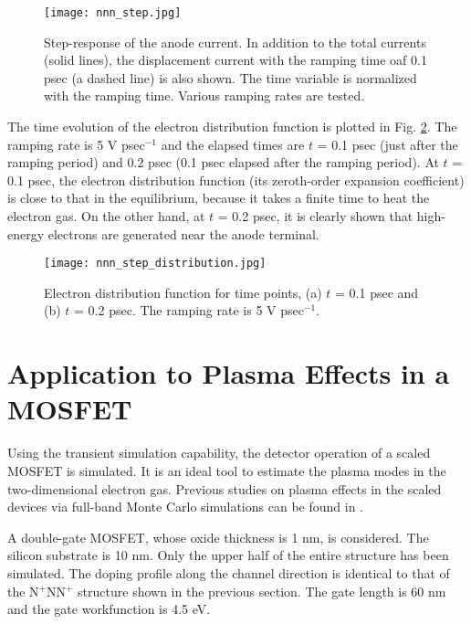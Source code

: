 \documentclass[journal]{IEEEtran}
\newcommand{\revision}[1]{{#1}}
\begin{document}
\begin{figure}[!t]
\centering
\texttt{[image: nnn\_step.jpg]}
\caption{Step-response of the anode current. 
\revision{In addition to the total currents (solid lines), the displacement current with the ramping time oaf 0.1 psec (a dashed line) is also shown.}
The time variable is normalized with the ramping time.
Various ramping rates are tested.}
\label{fig_nnn_step}
\end{figure}  

   The time evolution of the electron distribution function is plotted in Fig. \ref{fig_nnn_step_distribution}.    
   The ramping rate is 5 V psec$^{-1}$ and the elapsed times are $t$ = 0.1 psec (just after the ramping period) and 0.2 psec (0.1 psec elapsed after the ramping period).
   At $t$ = 0.1 psec, the electron distribution function (its zeroth-order expansion coefficient) is close to that in the equilibrium, because it takes a finite time to heat the electron gas.
   On the other hand, at $t$ = 0.2 psec, it is clearly shown that high-energy electrons are generated near the anode terminal. 

\begin{figure}[!t]
\centering
\texttt{[image: nnn\_step\_distribution.jpg]}
\caption{Electron distribution function for time points, (a) $t$ = 0.1 psec and (b) $t$ = 0.2 psec.
The ramping rate is 5 V psec$^{-1}$.
}
\label{fig_nnn_step_distribution}
\end{figure} 
   

\section{Application to Plasma Effects in a MOSFET}

\revision{Using the transient simulation capability,
the detector operation of a scaled MOSFET is simulated.}
   It is an ideal tool to estimate the plasma modes in the two-dimensional electron gas.
\revision{Previous studies on plasma effects in the scaled devices via full-band Monte Carlo simulations can be found in \cite{Fischetti2001,Sano2011}.
}

   A double-gate MOSFET, whose oxide thickness is 1 nm, is considered. 
   The silicon substrate is 10 nm.
   Only the upper half of the entire structure has been simulated.
   The doping profile along the channel direction is identical to that of the N$^+$NN$^+$ structure shown in the previous section.
   The gate length is 60 nm and the gate workfunction is 4.5 eV.
    
\end{document}
